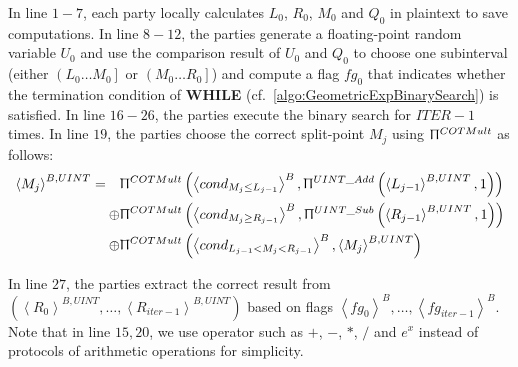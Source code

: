                   In line $1-7$, each party locally calculates $L_0$, $R_0$, $M_0$ and $Q_0$ in plaintext to save \smpc computations.
                  In line $8-12$, the parties generate a floating-point random variable $U_0$ and use the comparison result of $U_0$ and $Q_0$ to choose one subinterval (either $\left(L_0\ldots M_0\right] $ or $\left(M_0\ldots R_0\right] $) and compute a flag $fg_0$ that indicates whether the termination condition of \textbf{WHILE} (cf.~\autoref{algo:GeometricExpBinarySearch}) is satisfied.
      In line $16-26$, the parties execute the binary search for $ITER-1$ times.
      In line $19$, the parties choose the correct split-point $M_j$ using $ \Uppi^{COTMult}$ as follows:
      \begin{equation}
            \label{eq:ISMiddlePoint}
            \begin{split}
                  \left\langle {M_j}\right\rangle ^{B,UINT}=\quad & \Uppi^{COTMult}\left(\left\langle cond_{M_{j}\leq L_{j-1}}\right\rangle ^B , \Uppi^{UINT\_Add}\left(\left\langle {L_{j-1}}\right\rangle^{B,UINT},1 \right)\right) \\
                  \oplus &\Uppi^{COTMult}\left(\left\langle cond_{M_{j} \geq R_{j-1}}\right\rangle ^B , \Uppi^{UINT\_Sub}\left(\left\langle {R_{j-1}}\right\rangle ^{B,UINT},1\right)\right)  \\
                  \oplus & \Uppi^{COTMult}\left(\left\langle cond_{L_{j-1}<M_{j} < R_{j-1}}\right\rangle^B , \left\langle {M_j}\right\rangle^{B,UINT}\right)
            \end{split}
      \end{equation}

      In line $27$, the parties extract the correct result from $\left(\left\langle {R_0}\right\rangle ^{B,UINT} ,\ldots ,\left\langle {R_{iter-1}}\right\rangle ^{B,UINT}\right) $ based on flags $\left\langle fg_0\right\rangle ^{B},\ldots,\left\langle fg_{iter-1}\right\rangle ^{B}$.
      Note that in line $15,20$, we use operator such as $+$, $-$, $*$, $/$ and $e^{x}$ instead of \smpc protocols of arithmetic operations for simplicity.

